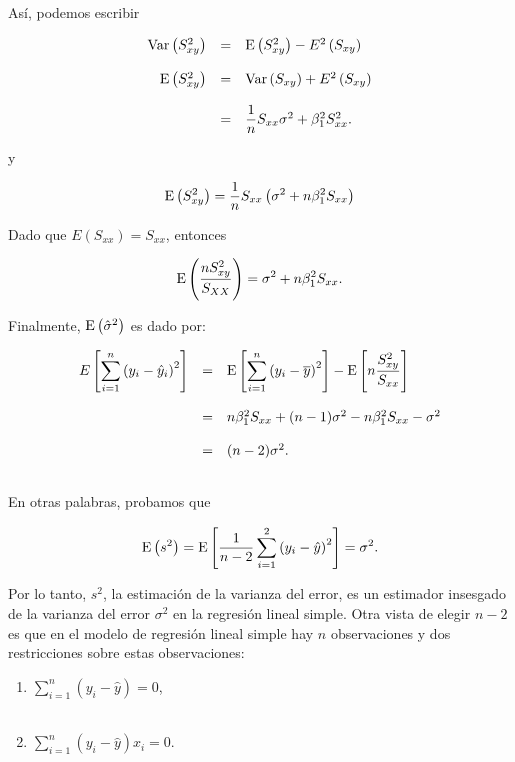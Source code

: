 Así, podemos escribir

$$
\begin{array}{rcl}
    \Var\left(S_{xy}^2\right) &=& \E\left(S_{xy}^2\right)-E^2\left(S_{xy}\right)\\\\
    \E\left(S_{xy}^2\right) &=& \Var\left(S_{xy}\right)+E^2\left(S_{xy}\right)\\\\
			    &=& \dfrac{1}{n}S_{xx}\sigma^2+\beta_{1}^2 S^2_{xx}.

\end{array}
$$

y

$$
\mathop{\mbox{\normalfont E}}\nolimits\left(S_{xy}^2\right)=\dfrac{1}{n}S_{xx}\left(\sigma^2+n\beta_{1}^2 S_{xx}\right)
$$

Dado que $E\left(S_{xx}\right)=S_{xx}$, entonces

$$
\mathop{\mbox{\normalfont E}}\nolimits\left(\dfrac{nS_{xy}^2}{S_{XX}}\right)=\sigma^2+n\beta_{1}^2 S_{xx}.
$$

Finalmente, $\mathop{\mbox{\normalfont E}}\nolimits\left(\hat{\sigma}^2\right)$ es dado por:

$$
\begin{array}{rcl}
    E\left[\displaystyle\sum_{i=1}^n \left(y_i-\hat{y}_i\right)^2\right] &=& \mathop{\mbox{\normalfont E}}\nolimits\left[\displaystyle\sum_{i=1}^n\left(y_i-\overline{y}\right)^2\right]-\mathop{\mbox{\normalfont E}}\nolimits\left[n\dfrac{S_{xy}^2}{S_{xx}}\right]\\\\
    &=&n\beta_1^2 S_{xx}+(n-1)\sigma^2-n\beta_1^2S_{xx}-\sigma^2\\\\
								      &=&(n-2)\sigma^2.\\\\
\end{array}
$$

En otras palabras, probamos que

\begin{tcolorbox}
    $$\mathop{\mbox{\normalfont E}}\nolimits\left(s^2\right)=\mathop{\mbox{\normalfont E}}\nolimits\left[\dfrac{1}{n-2}\sum_{i=1}^2\left(y_i-\hat{y}\right)^2\right]=\sigma^2.$$
\end{tcolorbox}

Por lo tanto, $s^2$, la estimación de la varianza del error, es un estimador insesgado de la varianza del error $\sigma^2$ en la regresión lineal simple. Otra vista de elegir $n - 2$ es que en el modelo de regresión lineal simple hay $n$ observaciones y dos restricciones sobre estas observaciones:

\begin{enumerate}
    \item $\displaystyle\sum_{i=1}^n \left(y_i-\hat{y}\right)=0$,\\\\
    \item $\displaystyle\sum_{i=1}^n \left(y_i-\hat{y}\right)x_i=0$.\\\\
\end{enumerate}


